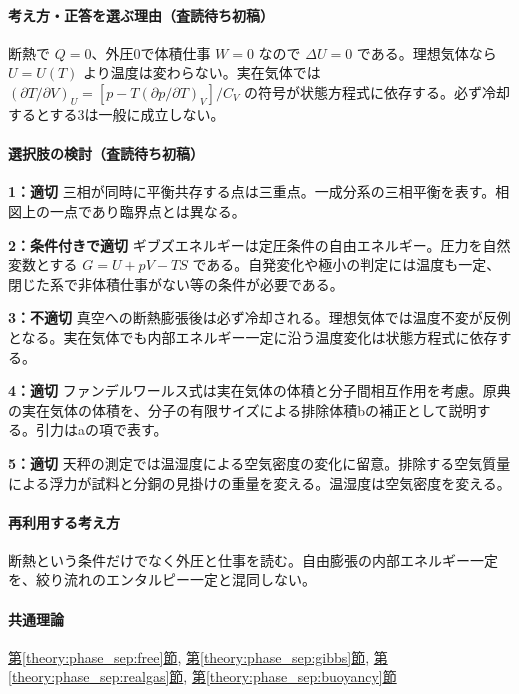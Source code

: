 \paragraph{考え方・正答を選ぶ理由（査読待ち初稿）} 断熱で \(Q=0\)、外圧0で体積仕事 \(W=0\) なので \(\Delta U=0\) である。理想気体なら \(U=U(T)\) より温度は変わらない。実在気体では \((\partial T/\partial V)_U=[p-T(\partial p/\partial T)_V]/C_V\) の符号が状態方程式に依存する。必ず冷却するとする3は一般に成立しない。

\paragraph{選択肢の検討（査読待ち初稿）}\mbox{}\par

\noindent\textbf{1：適切} 三相が同時に平衡共存する点は三重点。一成分系の三相平衡を表す。相図上の一点であり臨界点とは異なる。\par

\noindent\textbf{2：条件付きで適切} ギブズエネルギーは定圧条件の自由エネルギー。圧力を自然変数とする \(G=U+pV-TS\) である。自発変化や極小の判定には温度も一定、閉じた系で非体積仕事がない等の条件が必要である。\par

\noindent\textbf{3：不適切} 真空への断熱膨張後は必ず冷却される。理想気体では温度不変が反例となる。実在気体でも内部エネルギー一定に沿う温度変化は状態方程式に依存する。\par

\noindent\textbf{4：適切} ファンデルワールス式は実在気体の体積と分子間相互作用を考慮。原典の実在気体の体積を、分子の有限サイズによる排除体積bの補正として説明する。引力はaの項で表す。\par

\noindent\textbf{5：適切} 天秤の測定では温湿度による空気密度の変化に留意。排除する空気質量による浮力が試料と分銅の見掛けの重量を変える。温湿度は空気密度を変える。\par

\paragraph{再利用する考え方} 断熱という条件だけでなく外圧と仕事を読む。自由膨張の内部エネルギー一定を、絞り流れのエンタルピー一定と混同しない。

\paragraph{共通理論} \hyperref[theory:phase_sep:free]{第\ref*{theory:phase_sep:free}節}, \hyperref[theory:phase_sep:gibbs]{第\ref*{theory:phase_sep:gibbs}節}, \hyperref[theory:phase_sep:realgas]{第\ref*{theory:phase_sep:realgas}節}, \hyperref[theory:phase_sep:buoyancy]{第\ref*{theory:phase_sep:buoyancy}節}

